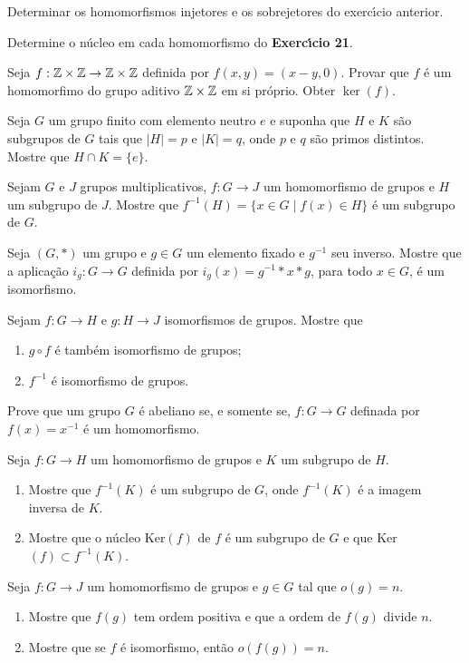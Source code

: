 \documentclass[12pt]{article}
\begin{document}
\vesp

\questao Determinar os homomorfismos injetores e os sobrejetores do exerc{\'\i}cio anterior.

\vesp

\questao Determine o n\'ucleo em cada homomorfismo do \textbf{Exerc{\'\i}cio 21}.

\vesp

\questao Seja $f: \mathbb{Z} \times \mathbb{Z} \to \mathbb{Z} \times \mathbb{Z}$ definida por $f(x, y) = (x - y, 0)$. Provar que $f$ \'e um homomorfimo do grupo aditivo $\mathbb{Z} \times \mathbb{Z}$ em si pr\'oprio. Obter $\ker(f)$.

\vesp

\questao Seja $G$ um grupo finito com elemento
neutro $e$ e suponha que $H$ e $K$ s{\~a}o subgrupos de $G$ tais que
$|H|=p$ e $|K|=q$, onde $p$ e $q$ s{\~a}o primos distintos. Mostre que
$H\cap K=\{e\}$.

\vesp

\questao Sejam $G$ e $J$ grupos multiplicativos, $f : G \to J$ um homomorfismo de grupos e $H$ um subgrupo de $J$. Mostre que $f^{-1}(H) = \{ x \in G \mid f(x) \in H\}$ {\'e} um subgrupo de $G$.

\vesp

\questao Seja $(G, *)$ um grupo e $g\in G$ um elemento fixado e $g^{-1}$
seu inverso. Mostre que a aplica{\c c}{\~a}o $i_g: G\to G$ definida por
$i_g(x)=g^{-1}*x*g$, para todo $x \in G$, {\'e} um isomorfismo.

\vesp

\questao Sejam $f:G\to H$ e $g:H\to J$ isomorfismos de grupos. Mostre
que
\begin{enumerate}[label=({\alph*})]
\item $g\circ f$ {\'e} tamb{\'e}m isomorfismo de grupos;
\item $f^{-1}$ {\'e} isomorfismo de grupos.
\end{enumerate}

\vesp


\questao Prove que um grupo $G$ {\'e} abeliano se, e somente se, $f : G \to G$ definada por $f(x) = x^{-1}$ {\'e} um homomorfismo.

\vesp

\questao Seja $f: G\to H$ um
homomorfismo de grupos e $K$ um subgrupo de $H$.
\begin{enumerate}[label=({\alph*})]
\item Mostre que $f^{-1}(K)$ {\'e} um subgrupo de $G$, onde $f^{-1}(K)$ {\'e} a imagem inversa de $K$.
\item Mostre que o n{\'u}cleo Ker$(f)$ de $f$ {\'e} um subgrupo de
$G$  e que Ker$(f)\subset f^{-1}(K)$.
\end{enumerate}

\vesp

\questao Seja $f: G \to J$ um homomorfismo de grupos e $g\in G$ tal que $o(g)=n$.
\begin{enumerate}[label=({\alph*})]
\item Mostre que $f(g)$ tem ordem positiva e que a ordem de $f(g)$ divide $n$.
\item Mostre que se $f$ {\'e} isomorfismo, ent{\~a}o $o(f(g))=n$.
\end{enumerate}
\end{document}

